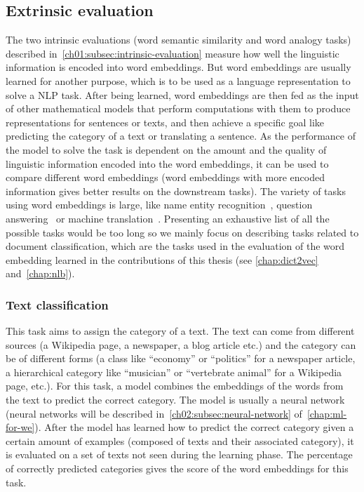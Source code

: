   \subsection{Extrinsic evaluation}
    \label{ch01:subsec:extrinsic-evaluation}
    The two intrinsic evaluations (word semantic similarity and word analogy
    tasks) described in~\autoref{ch01:subsec:intrinsic-evaluation} measure how
    well the linguistic information is encoded into word embeddings. But word
    embeddings are usually learned for another purpose, which is to be used as a
    language representation to solve a NLP task. After being learned, word
    embeddings are then fed as the input of other mathematical models that
    perform computations with them to produce representations for sentences or
    texts, and then achieve a specific goal like predicting the category of a
    text or translating a sentence. As the performance of the model to solve the
    task is dependent on the amount and the quality of linguistic information
    encoded into the word embeddings, it can be used to compare different word
    embeddings (word embeddings with more encoded information gives better
    results on the downstream tasks). The variety of tasks using word embeddings
    is large, like name entity recognition~\citep{turian2010word,
    pennington2014glove}, question answering~\citep{bordes2014open} or machine
    translation~\citep{zou2013bilingual, lample2018word}. Presenting an
    exhaustive list of all the possible tasks would be too long so we mainly
    focus on describing tasks related to document classification, which are the
    tasks used in the evaluation of the word embedding learned in the
    contributions of this thesis (see \autoref{chap:dict2vec}
    and~\autoref{chap:nlb}).

    \subsubsection{Text classification}
      \label{ch01:subsubsec:text-classification-task}
      This task aims to assign the category of a text. The text can come from
      different sources (a Wikipedia page, a newspaper, a blog article etc.)
      and the category can be of different forms (a class like ``economy'' or
      ``politics'' for a newspaper article, a hierarchical category like
      ``musician'' or ``vertebrate animal'' for a Wikipedia page, etc.). For this
      task, a model combines the embeddings of the words from the text to
      predict the correct category. The model is usually a neural network
      (neural networks will be described in~\autoref{ch02:subsec:neural-network}
      of~\autoref{chap:ml-for-we}). After the model has learned how to predict the
      correct category given a certain amount of examples (composed of texts and
      their associated category), it is evaluated on a set of texts not seen
      during the learning phase. The percentage of correctly predicted
      categories gives the score of the word embeddings for this task.

